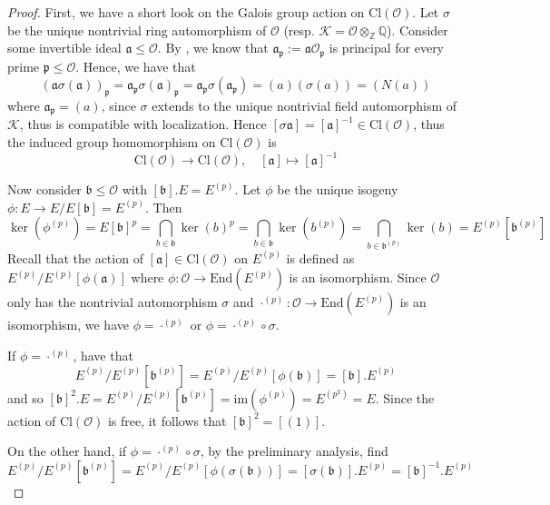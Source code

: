 \documentclass{scrartcl}
\newcommand{\Z}{\mathbb{Z}}
\newcommand{\End}{\mathrm{End}}
\newcommand{\Cl}{\mathrm{Cl}}
\newcommand{\K}{\mathcal{K}}
\newcommand{\p}{\mathfrak{p}}
\renewcommand{\a}{\mathfrak{a}}
\renewcommand{\b}{\mathfrak{b}}
\renewcommand{\O}{\mathcal{O}}
\theoremstyle{definition}
\begin{document}
\begin{proof}
    First, we have a short look on the Galois group action on $\Cl(\O)$.
    Let $\sigma$ be the unique nontrivial ring automorphism of $\O$ (resp. $\K = \O \otimes_{\Z} \mathbb{Q}$).
    Consider some invertible ideal $\a \leq \O$.
    By \cite[I.12.4]{neukirch}, we know that $\a_\p := \a \O_\p$ is principal for every prime $\p \leq \O$.
    Hence, we have that
    \begin{equation*}
        (\a \sigma(\a))_\p = \a_\p \sigma(\a)_\p = \a_\p \sigma (\a_\p) = (a)(\sigma(a)) = (N(a))
    \end{equation*}
    where $\a_\p = (a)$, since $\sigma$ extends to the unique nontrivial field automorphism of $\K$, thus is compatible with localization.
    Hence $[\sigma\a] = [\a]^{-1} \in \Cl(\O)$, thus the induced group homomorphism on $\Cl(\O)$ is
    \begin{equation*}
        \Cl(\O) \to \Cl(\O), \quad [\a] \mapsto [\a]^{-1}
    \end{equation*}

    Now consider $\b \leq \O$ with $[\b].E = E^{(p)}$.
    Let $\phi$ be the unique isogeny $\phi: E \to E/E[\b] = E^{(p)}$.
    Then
    \begin{equation*}
        \ker(\phi^{(p)}) = E[\b]^p = \bigcap_{b \in \b} \ker(b)^p = \bigcap_{b \in \b} \ker(b^{(p)}) = \bigcap_{b \in \b^{(p)}} \ker(b) = E^{(p)}[\b^{(p)}]
    \end{equation*}
    Recall that the action of $[\a] \in \Cl(\O)$ on $E^{(p)}$ is defined as $E^{(p)}/E^{(p)}[\phi(\a)]$ where $\phi: \O \to \End(E^{(p)})$ is an isomorphism.
    Since $\O$ only has the nontrivial automorphism $\sigma$ and $\cdot^{(p)}: \O \to \End(E^{(p)})$ is an isomorphism, we have $\phi = \cdot^{(p)}$ or $\phi = \cdot^{(p)} \circ \sigma$.

    If $\phi = \cdot^{(p)}$, have that
    \begin{equation*}
        E^{(p)}/E^{(p)}[\b^{(p)}] = E^{(p)}/E^{(p)}[\phi(\b)] = [\b].E^{(p)}
    \end{equation*}
    and so $[\b]^2.E = E^{(p)}/E^{(p)}[\b^{(p)}] = \mathrm{im}(\phi^{(p)}) = E^{(p^2)} = E$.
    Since the action of $\Cl(\O)$ is free, it follows that $[\b]^2 = [(1)]$.

    On the other hand, if $\phi = \cdot^{(p)} \circ \sigma$, by the preliminary analysis, find
    \begin{equation*}
        E^{(p)}/E^{(p)}[\b^{(p)}] = E^{(p)}/E^{(p)}[\phi(\sigma(\b))] = [\sigma(\b)].E^{(p)} = [\b]^{-1}.E^{(p)}
    \end{equation*}

\end{proof}
\end{document}
